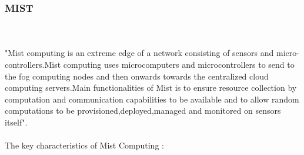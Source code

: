 \subsubsection{MIST}
\hfill\\
\hfill\\
"Mist computing is an extreme edge of a network consisting of sensors and micro-controllers.Mist computing uses microcomputers and microcontrollers to send to the fog computing nodes and then onwards towards the centralized cloud computing servers.Main functionalities of Mist is to ensure resource collection by computation and communication capabilities to be available and to allow random computations to be provisioned,deployed,managed and monitored on sensors itself\cite{1}".\\ \\
The key characteristics of Mist Computing :\\
